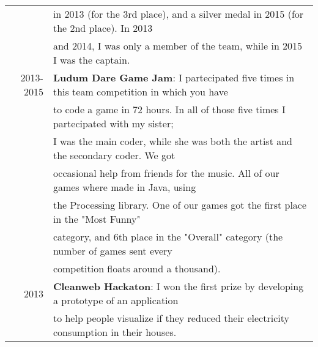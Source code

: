 \documentclass[a4paper,10pt]{article} %
\begin{document}
\begin{tabular}{rl}
     & in 2013 (for the 3rd place), and a silver medal in 2015 (for the 2nd place). In 2013\\
     & and 2014, I was only a member of the team, while in 2015 I was the captain.\\
2013-2015 & \textbf{Ludum Dare Game Jam}: I partecipated five times in this team competition in which you have\\
     & to code a game in 72 hours. In all of those five times I partecipated with my sister;\\
     & I was the main coder, while she was both the artist and the secondary coder. We got \\
     & occasional help from friends for the music. All of our games where made in Java, using \\
     & the Processing library. One of our games got the first place in the "Most Funny" \\
     & category, and 6th place in the "Overall" category (the number of games sent every \\
     & competition floats around a thousand).\\
2013 & \textbf{Cleanweb Hackaton}: I won the first prize by developing a prototype of an application\\
     & to help people visualize if they reduced their electricity consumption in their houses.\\
\end{tabular}



\bigskip
\bigskip
\end{document}

